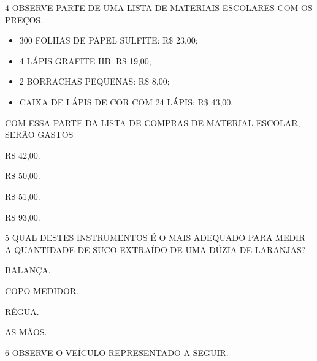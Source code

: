 \num{4} OBSERVE PARTE DE UMA LISTA DE MATERIAIS ESCOLARES COM OS PREÇOS.

\begin{myquote}
\begin{itemize}
  \item 300 FOLHAS DE PAPEL SULFITE: R\$ 23,00;
  \item 4 LÁPIS GRAFITE HB: R\$ 19,00;
  \item 2 BORRACHAS PEQUENAS: R\$ 8,00;
  \item CAIXA DE LÁPIS DE COR COM 24 LÁPIS: R\$ 43,00.
\end{itemize}
\end{myquote}


COM ESSA PARTE DA LISTA DE COMPRAS DE MATERIAL ESCOLAR, SERÃO GASTOS

\begin{multicols}{2}
\begin{escolha}[itemsep=0pt]
\item R\$ 42,00.

\item R\$ 50,00.

\item R\$ 51,00.

\item R\$ 93,00.
\end{escolha}
\end{multicols}

\num{5} QUAL DESTES INSTRUMENTOS É O MAIS ADEQUADO PARA MEDIR A QUANTIDADE DE SUCO EXTRAÍDO DE UMA DÚZIA DE LARANJAS?

\begin{escolha}[itemsep=0pt]
\item BALANÇA.

\item COPO MEDIDOR.

\item RÉGUA.

\item AS MÃOS.
\end{escolha}

\num{6} OBSERVE O VEÍCULO REPRESENTADO A SEGUIR.

